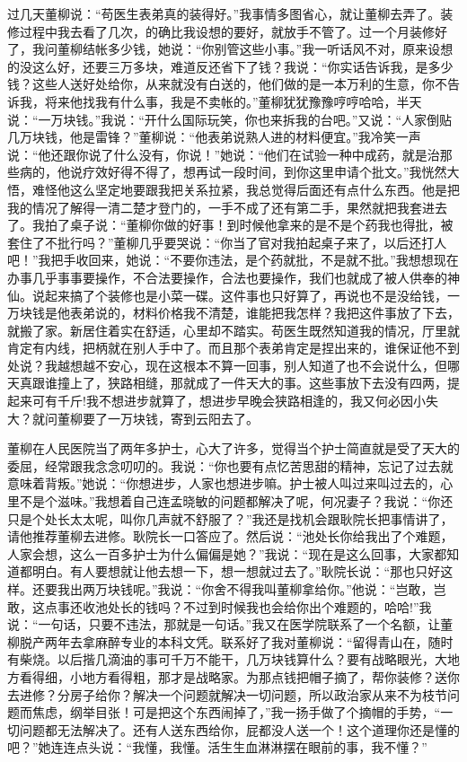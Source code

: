 \documentclass[12pt,oneside]{book}
\begin{document}
过几天董柳说：``苟医生表弟真的装得好。''我事情多图省心，就让董柳去弄了。装修过程中我去看了几次，的确比我设想的要好，就放手不管了。过一个月装修好了，我问董柳结帐多少钱，她说：``你别管这些小事。''我一听话风不对，原来设想的没这么好，还要三万多块，难道反还省下了钱？我说：``你实话告诉我，是多少钱？这些人送好处给你，从来就没有白送的，他们做的是一本万利的生意，你不告诉我，将来他找我有什么事，我是不卖帐的。''董柳犹犹豫豫哼哼哈哈，半天说：``一万块钱。''我说：``开什么国际玩笑，你也来拆我的台吧。''又说：``人家倒贴几万块钱，他是雷锋？''董柳说：``他表弟说熟人进的材料便宜。''我冷笑一声说：``他还跟你说了什么没有，你说！''她说：``他们在试验一种中成药，就是治那些病的，他说疗效好得不得了，想再试一段时间，到你这里申请个批文。''我恍然大悟，难怪他这么坚定地要跟我把关系拉紧，我总觉得后面还有点什么东西。他是把我的情况了解得一清二楚才登门的，一手不成了还有第二手，果然就把我套进去了。我拍了桌子说：``董柳你做的好事！到时候他拿来的是不是个药我也得批，被套住了不批行吗？''董柳几乎要哭说：``你当了官对我拍起桌子来了，以后还打人吧！''我把手收回来，她说：``不要你违法，是个药就批，不是就不批。''我想想现在办事几乎事事要操作，不合法要操作，合法也要操作，我们也就成了被人供奉的神仙。说起来搞了个装修也是小菜一碟。这件事也只好算了，再说也不是没给钱，一万块钱是他表弟说的，材料价格我不清楚，谁能把我怎样？我把这件事放了下去，就搬了家。新居住着实在舒适，心里却不踏实。苟医生既然知道我的情况，厅里就肯定有内线，把柄就在别人手中了。而且那个表弟肯定是捏出来的，谁保证他不到处说？我越想越不安心，现在这根本不算一回事，别人知道了也不会说什么，但哪天真跟谁撞上了，狭路相缝，那就成了一件天大的事。这些事放下去没有四两，提起来可有千斤!我不想进步就算了，想进步早晚会狭路相逢的，我又何必因小失大？就问董柳要了一万块钱，寄到云阳去了。

董柳在人民医院当了两年多护士，心大了许多，觉得当个护士简直就是受了天大的委屈，经常跟我念念叨叨的。我说：``你也要有点忆苦思甜的精神，忘记了过去就意味着背叛。''她说：``你想进步，人家也想进步嘛。护士被人叫过来叫过去的，心里不是个滋味。''我想着自己连孟晓敏的问题都解决了呢，何况妻子？我说：``你还只是个处长太太呢，叫你几声就不舒服了？''我还是找机会跟耿院长把事情讲了，请他推荐董柳去进修。耿院长一口答应了。然后说：``池处长你给我出了个难题，人家会想，这么一百多护士为什么偏偏是她？''我说：``现在是这么回事，大家都知道都明白。有人要想就让他去想一下，想一想就过去了。''耿院长说：``那也只好这样。还要我出两万块钱呢。''我说：``你舍不得我叫董柳拿给你。''他说：``岂敢，岂敢，这点事还收池处长的钱吗？不过到时候我也会给你出个难题的，哈哈!''我说：``一句话，只要不违法，那就是一句话。''我又在医学院联系了一个名额，让董柳脱产两年去拿麻醉专业的本科文凭。联系好了我对董柳说：``留得青山在，随时有柴烧。以后揩几滴油的事可千万不能干，几万块钱算什么？要有战略眼光，大地方看得细，小地方看得粗，那才是战略家。为那点钱把帽子摘了，帮你装修？送你去进修？分房子给你？解决一个问题就解决一切问题，所以政治家从来不为枝节问题而焦虑，纲举目张！可是把这个东西闹掉了，''我一扬手做了个摘帽的手势，``一切问题都无法解决了。还有人送东西给你，屁都没人送一个！这个道理你还是懂的吧？''她连连点头说：``我懂，我懂。活生生血淋淋摆在眼前的事，我不懂？''
\end{document}
